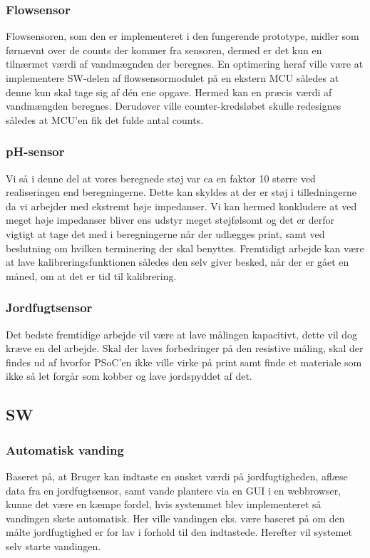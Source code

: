 \subsubsection{Flowsensor}
Flowsensoren, som den er implementeret i den fungerende prototype, midler som førnævnt over de counts der kommer fra sensoren, dermed er det kun en tilnærmet værdi af vandmægnden der beregnes. En optimering heraf ville være at implementere SW-delen af flowsensormodulet på en ekstern MCU således at denne kun skal tage sig af dén ene opgave. Hermed kan en præcis værdi af vandmængden beregnes. Derudover ville counter-kredsløbet skulle redesignes således at MCU'en fik det fulde antal counts.\newline

\subsubsection{pH-sensor}
Vi så i denne del at vores beregnede støj var ca en faktor 10 større ved realiseringen end beregningerne. Dette kan skyldes at der er støj i tilledningerne da vi arbejder med ekstremt høje impedanser. Vi kan hermed konkludere at ved meget høje impedanser bliver ens udstyr meget støjfølsomt og det er derfor vigtigt at tage det med i beregningerne når der udlægges print, samt ved beslutning om hvilken terminering der skal benyttes. Fremtidigt arbejde kan være at lave kalibreringsfunktionen således den selv giver besked, når der er gået en måned, om at det er tid til kalibrering. 
 
\subsubsection{Jordfugtsensor}
Det bedste fremtidige arbejde vil være at lave målingen kapacitivt, dette vil dog kræve en del arbejde. Skal der laves forbedringer på den resistive måling, skal der findes ud af hvorfor PSoC'en ikke ville virke på print samt finde et materiale som ikke så let forgår som kobber og lave jordspyddet af det. 
 
 
 \subsection{SW} 
\subsubsection{Automatisk vanding}
Baseret på, at Bruger kan indtaste en ønsket værdi på jordfugtigheden, aflæse data fra en jordfugtsensor, samt vande plantere via en GUI i en webbrowser, kunne det være en kæmpe fordel, hvis systemmet blev implementeret så vandingen skete automatisk. Her ville vandingen eks. være baseret på om den målte jordfugtighed er for lav i forhold til den indtastede. Herefter vil systemet selv starte vandingen.\newline 


